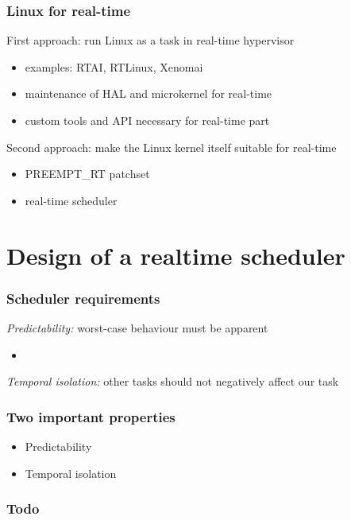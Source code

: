 \documentclass[aspectratio=1610,xcolor=svgnames]{beamer}
\newcommand{\tikzdbg}{%
  \draw[step=1,color=lightgray] (-7,0) grid (7,7);%
  \fill[red] (0,0) circle (0.2);%
}
\begin{document}
\begin{frame}\frametitle{Linux for real-time}
  First approach: run Linux as a task in real-time hypervisor
  \begin{itemize}
  \item examples: RTAI, RTLinux, Xenomai
  \item maintenance of HAL and microkernel for real-time
  \item custom tools and API necessary for real-time part 
  \end{itemize}

  \pause

  Second approach: make the Linux kernel itself suitable for real-time
  \begin{itemize}
  \item PREEMPT\_RT patchset
  \item<3-> \alert{real-time scheduler}
  \end{itemize}
\end{frame}

\section{Design of a realtime scheduler}

\begin{frame}\frametitle{Scheduler requirements}
  \textit{Predictability:} worst-case behaviour must be apparent
  \begin{itemize}
    \item 
  \end{itemize}

  \textit{Temporal isolation:} other tasks should not negatively affect our task
\end{frame}

\begin{frame}\frametitle{Two important properties}
  \begin{itemize}
    \item Predictability
    \item Temporal isolation
  \end{itemize}
\end{frame}

\begin{frame}
  \frametitle{Todo}
  
\end{frame}
\end{document}
